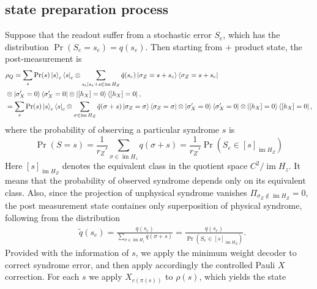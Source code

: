 \documentclass[twoside,english,aps,showpacs,pra,superscriptaddress]{revtex4-2}
\DeclareMathOperator{\im}{im}
\begin{document}
\subsection{state preparation process}
Suppose that the readout suffer from a stochastic error $S_e$, which has the distribution $\Pr(S_e=s_e)=q(s_e)$. Then starting from $+$ product state, the post-measurement is
    \begin{equation}
    \begin{aligned}
        &\rho_Q = \sum_s \Pr(s) \ket{s}_c\bra{s}_c \otimes  \sum_{s_e|s_e+s\in \im H_Z}  \tilde{q}(s_e) \ket{\sigma_{Z} = s+s_e}\bra{\sigma_{Z} = s+s_e}\\& \otimes \ket{\sigma_{X}' = 0}\bra{\sigma_{X}' = 0} \otimes \ket{[h_X]=0}\bra{[h_X]=0},\\
        &= \sum_s \Pr(s) \ket{s}_c\bra{s}_c \otimes  \sum_{\sigma \in \im H_Z}  \tilde{q}(\sigma+s) \ket{\sigma_{Z} = \sigma}\bra{\sigma_{Z} = \sigma} \otimes \ket{\sigma_{X}' = 0}\bra{\sigma_{X}' = 0} \otimes \ket{[h_X]=0}\bra{[h_X]=0},
    \end{aligned}
    \end{equation}
where the probability of observing a particular syndrome $s$ is
\begin{equation}
    \Pr(S=s) = \frac{1}{r_Z'}\sum_{\sigma \in \im H_z} q(\sigma+s) = \frac{1}{r_Z'} \Pr(S_e \in [s]_{\im H_Z})
\end{equation}
Here $[s]_{\im H_Z}$ denotes the equivalent class in the quotient space $C^2/\im H_z$. It means that the probability of observed syndrome depends only on its equivalent class. Also, since the projection of unphysical syndrome vanishes $\Pi_{\sigma_Z \notin \im H_Z}=0$, the post measurement state containes only superposition of physical syndrome, following from the distribution
\begin{equation}
\begin{aligned}
    &\tilde{q}(s_e) = \frac{q(s_e)}{\sum_{\sigma \in \im H_z} q(\sigma+s)} = \frac{q(s_e)}{\Pr(S_e \in [s]_{\im H_Z})}.
\end{aligned}
\end{equation}
Provided with the information of $s$, we apply the minimum weight decoder to correct syndrome error, and then apply accordingly the controlled Pauli $X$ correction. For each $s$ we apply $X_{c(\pi(s))}$ to $\rho(s)$, which yields the state
\end{document}
